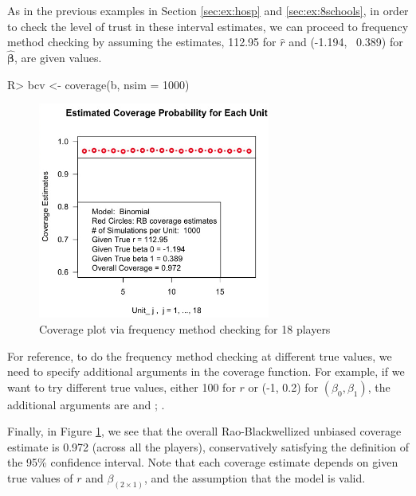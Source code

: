 \documentclass[article]{jss}
\begin{document}
As in the previous examples in Section \ref{sec:ex:hosp} and \ref{sec:ex:8schools}, in order to check the level of trust in these interval estimates, we can proceed to frequency method checking by assuming the estimates, 112.95 for $\hat{r}$ and (-1.194, ~0.389) for $\hat{\boldsymbol{\beta}}$, are given values. 

\begin{CodeChunk}
\begin{CodeInput}
R> bcv <- coverage(b, nsim = 1000) 
\end{CodeInput}
\end{CodeChunk}
\begin{figure}[h]
\begin{center}
\includegraphics[width = 3in]{baseball2.png}
\caption{Coverage plot via frequency method checking for 18 players}
\label{fig:baseball2}
\end{center}
\end{figure}

For reference, to do the frequency method checking at different true values, we need to specify additional arguments in the coverage function. For example, if we want to try different true values, either 100 for $r$ or (-1, 0.2) for $(\beta_{0}, \beta_{1})$, the additional arguments are  and ; .


Finally, in Figure \ref{fig:baseball2}, we see that the overall Rao-Blackwellized unbiased coverage estimate is 0.972 (across all the players), conservatively satisfying the definition of the 95\% confidence interval. Note that each coverage estimate depends on given true values of $r$ and $\beta_{(2\times1)}$, and the assumption that the model is valid.
\end{document}

